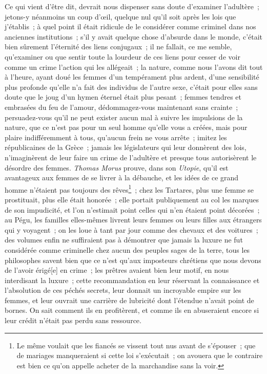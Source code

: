 \documentclass[french,twoside]{book} %
\begin{document}
Ce qui vient d’être dit, devrait nous dispenser sans doute d’examiner l’adultère ; jetons-y néanmoins un coup d’œil, quelque nul qu’il soit après les lois que j’établis ; à quel point il était ridicule de le considérer comme criminel dans nos anciennes institutions ; s’il y avait quelque chose d’absurde dans le monde, c’était bien sûrement l’éternité des liens conjugaux ; il ne fallait, ce me semble, qu’examiner ou que sentir toute la lourdeur de ces liens pour cesser de voir comme un crime l’action qui les allégeait ; la nature, comme nous l’avons dit tout à l’heure, ayant doué les femmes d’un tempérament plus ardent, d’une sensibilité plus profonde qu’elle n’a fait des individus de l’autre sexe, c’était pour elles sans doute que le joug d’un hymen éternel était plus pesant ; femmes tendres et embrasées du feu de l’amour, dédommagez-vous maintenant sans crainte ; persuadez-vous qu’il ne peut exister aucun mal à suivre les impulsions de la nature, que ce n’est pas pour un seul homme qu’elle vous a créées, mais pour plaire indifféremment à tous, qu’aucun frein ne vous arrête ; imitez les républicaines de la Grèce ; jamais les législateurs qui leur donnèrent des lois, n’imaginèrent de leur faire un crime de l’adultère et presque tous autorisèrent le désordre des femmes. {\itshape Thomas Morus} prouve, dans son {\itshape Utopie}, qu’il est avantageux aux femmes de se livrer à la débauche, et les idées de ce grand homme n’étaient pas toujours des rêves\footnote{ Le même voulait que les fiancés se vissent tout nus avant de s’épouser ; que de mariages manqueraient si cette loi s’exécutait ; on avouera que le contraire est bien ce qu’on appelle acheter de la marchandise sans la voir.} ; chez les Tartares, plus une femme se prostituait, plus elle était honorée ; elle portait publiquement au col les marques de son impudicité, et l’on n’estimait point celles qui n’en étaient point décorées ; au Pégu, les familles elles-mêmes livrent leurs femmes ou leurs filles aux étrangers qui y voyagent ; on les loue à tant par jour comme des chevaux et des voitures ; des volumes enfin ne suffiraient pas à démontrer que jamais la luxure ne fut considérée comme criminelle chez aucun des peuples sages de la terre, tous les philosophes savent bien que ce n’est qu’aux imposteurs chrétiens que nous devons de l’avoir érigé[e] en crime ; les prêtres avaient bien leur motif, en nous interdisant la luxure ; cette recommandation en leur réservant la connaissance et l’absolution de ces péchés secrets, leur donnait un incroyable empire sur les femmes, et leur ouvrait une carrière de lubricité dont l’étendue n’avait point de bornes. On sait comment ils en profitèrent, et comme ils en abuseraient encore si leur crédit n’était pas perdu sans ressource.\par
\end{document}
